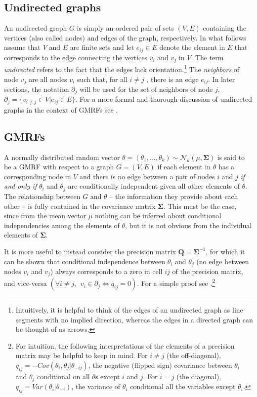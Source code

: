 \subsection{Undirected graphs}
 An undirected graph $G$ is simply an ordered pair of sets $(V,E)$ containing the vertices (also called nodes) and edges of the graph, respectively. In what follows assume that $V$ and $E$ are finite sets and let $e_{ij} \in E$ denote the element in $E$ that corresponds to the edge connecting the vertices $v_i$ and $v_j$ in $V$. The term {\it undirected} refers to the fact that the edges lack orientation.\footnote{Intuitively, it is helpful to think of the edges of an undirected graph as line segments with no implied direction, whereas the edges in a directed graph can be thought of as arrows.} The {\it neighbors} of node $v_j$ are all nodes $v_i$ such that, for all $i \neq j$ , there is an edge $e_{ij}$. In later sections, the notation $\partial_j$ will be used for the set of neighbors of node $j$, $ \partial_j = \{v_{i \neq j} \in V | e_{ij} \in E\}$. For a more formal and thorough discussion of undirected graphs in the context of GMRFs see . 

\subsection{GMRFs}
A normally distributed random vector $\theta = (\theta_1, \dots, \theta_k) \sim \mathcal{N}_k (\mu, \boldsymbol{\Sigma})$ is said to be a GMRF with respect to a graph $G = (V,E)$ if each element in $\theta$ has a corresponding node in $V$ and there is no edge between a pair of nodes $i$ and $j$ \emph{if and only if} $\theta_i$ and $\theta_j$ are conditionally independent given all other elements of $\theta$. The relationship between $G$ and $\theta$ -- the information they provide about each other -- is fully contained in the covariance matrix $\boldsymbol{\Sigma}$.  This must be the case, since from the mean vector $\mu$ nothing can be inferred about conditional independencies among the elements of $\theta$, but it is not obvious from the individual elements of $\boldsymbol{\Sigma}$. 

It is more useful to instead consider the precision matrix $\boldsymbol{Q}=\boldsymbol{\Sigma}^{-1}$, for which it can be shown that conditional independence between $\theta_i$ and $\theta_j$ (no edge between nodes $v_i$ and $v_j$) always corresponds to a zero in cell $ij$ of the precision matrix, and vice-versa $(\forall i \neq j, \:\: v_i \in \partial_j \iff q_{ij} = 0)$.  For a simple proof see .\footnote{For intuition, the following interpretations of the elements of a precision matrix may be helpful to keep in mind. For $i \neq j$ (the off-diagonal), $q_{ij}  = -Cov(\theta_i, \theta_j | \theta_{-ij}) $, the negative (flipped sign) covariance between $\theta_i$ and $\theta_j$ conditional on all $\theta$s except $i$ and $j$.  For $i = j$ (the diagonal),  $q_{ij} = Var(\theta_i | \theta_{-i})$, the variance of $\theta_i$ conditional all the variables except $\theta_i$.}






